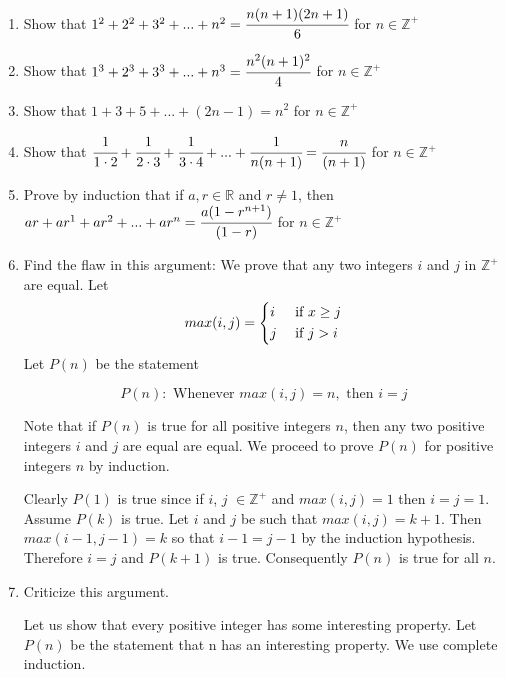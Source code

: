\documentclass[10pt,letterpaper]{article}
\begin{document}
\begin{enumerate}
  \item Show that $1^2 + 2^2 + 3^2 + . . . + n^2 = \cfrac{n(n+1)(2n+1)}{6}$ for $n \in \mathbb{Z}^+$
  
  \item Show that $1^3 + 2^3 + 3^3 + . . . + n^3 = \cfrac{n^2(n+1)^2}{4}$ for $n \in \mathbb{Z}^+$
  
  \item Show that $1 + 3 + 5 + . . . + (2n -1) = n^2$ for $n \in \mathbb{Z}^+$
  
  \item Show that $\cfrac{1}{1 \cdot 2} + \cfrac{1}{2 \cdot 3} + \cfrac{1}{3 \cdot 4} + . . . + \cfrac[align]{1}{n(n+1)} = \cfrac{n}{(n+1)}$ for $n \in \mathbb{Z}^+$
  
  \item Prove by induction that if $a, r  \in \mathbb{R}$ and $r \neq 1$, then
      $ar + ar^1 + ar^2 + . . . + ar^n = \cfrac{a(1-r^{n+1})}{(1-r)}$ for $n \in \mathbb{Z}^+$
  
  \item Find the flaw in this argument:
  We prove that any two integers $i$ and $j$ in $\mathbb{Z}^+$ are equal. Let
    \[
      max(i,j) =
      \begin{dcases}
        i & \text{ if } x \ge j\\
        j & \text{ if } j > i
      \end{dcases}
    \]
    Let $P(n)$ be the statement
    
    \[
        P(n): \text{ Whenever } max(i,j) = n, \text{ then } i=j
    \]    
      
    Note that if $P(n)$ is true for all positive integers $n$, then any two positive integers $i$ and $j$ are equal are equal. We proceed to prove $P(n)$ for positive integers $n$ by induction.
  
    Clearly $P(1)$ is true since if $i$, $j$ $\in \mathbb{Z}^+$ and $max(i,j)=1$ then $i=j=1$. Assume $P(k)$ is true. Let $i$ and $j$ be such that $max(i,j) = k+1$. Then $max(i-1,j-1) = k$ so that $i-1 = j-1$ by the induction hypothesis. Therefore $i=j$ and $P(k+1)$ is true. Consequently $P(n)$ is true for all $n$.
  
  \item Criticize this argument.
  
  Let us show that every positive integer has some interesting property. Let $P(n)$ be the statement that n has an interesting property. We use complete induction.
  

\end{enumerate}
\end{document}
